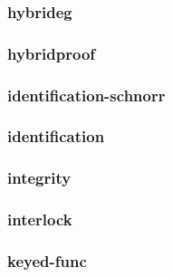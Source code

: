 \begin{frame}\frametitle{hybrideg}
\begin{figure}
\begin{center}

\end{center}
\end{figure}
\end{frame}
\begin{frame}\frametitle{hybridproof}
\begin{figure}
\begin{center}

\end{center}
\end{figure}
\end{frame}
\begin{frame}\frametitle{identification-schnorr}
\begin{figure}
\begin{center}

\end{center}
\end{figure}
\end{frame}
\begin{frame}\frametitle{identification}
\begin{figure}
\begin{center}

\end{center}
\end{figure}
\end{frame}
\begin{frame}\frametitle{integrity}
\begin{figure}
\begin{center}

\end{center}
\end{figure}
\end{frame}
\begin{frame}\frametitle{interlock}
\begin{figure}
\begin{center}

\end{center}
\end{figure}
\end{frame}
\begin{frame}\frametitle{keyed-func}
\begin{figure}
\begin{center}

\end{center}
\end{figure}
\end{frame}
